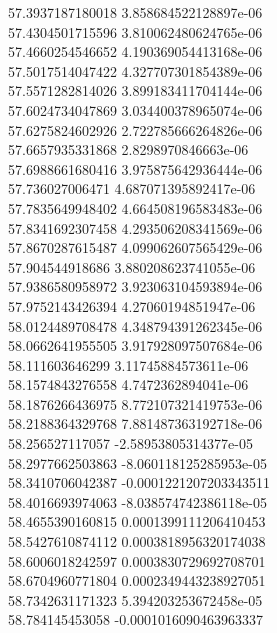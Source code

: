 {57.3937187180018 3.858684522128897e-06 \\
57.4304501715596 3.810062480624765e-06 \\
57.4660254546652 4.190369054413168e-06 \\
57.5017514047422 4.327707301854389e-06 \\
57.5571282814026 3.899183411704144e-06 \\
57.6024734047869 3.034400378965074e-06 \\
57.6275824602926 2.722785666264826e-06 \\
57.6657935331868 2.8298970846663e-06 \\
57.6988661680416 3.975875642936444e-06 \\
57.736027006471 4.687071395892417e-06 \\
57.7835649948402 4.664508196583483e-06 \\
57.8341692307458 4.293506208341569e-06 \\
57.8670287615487 4.099062607565429e-06 \\
57.904544918686 3.880208623741055e-06 \\
57.9386580958972 3.923063104593894e-06 \\
57.9752143426394 4.27060194851947e-06 \\
58.0124489708478 4.348794391262345e-06 \\
58.0662641955505 3.917928097507684e-06 \\
58.111603646299 3.11745884573611e-06 \\
58.1574843276558 4.7472362894041e-06 \\
58.1876266436975 8.772107321419753e-06 \\
58.2188364329768 7.881487363192718e-06 \\
58.256527117057 -2.58953805314377e-05 \\
58.2977662503863 -8.060118125285953e-05 \\
58.3410706042387 -0.0001221207203343511 \\
58.4016693974063 -8.038574742386118e-05 \\
58.4655390160815 0.0001399111206410453 \\
58.5427610874112 0.0003818956320174038 \\
58.6006018242597 0.0003830729692708701 \\
58.6704960771804 0.0002349443238927051 \\
58.7342631171323 5.394203253672458e-05 \\
58.784145453058 -0.0001016090463963337 \\
}
